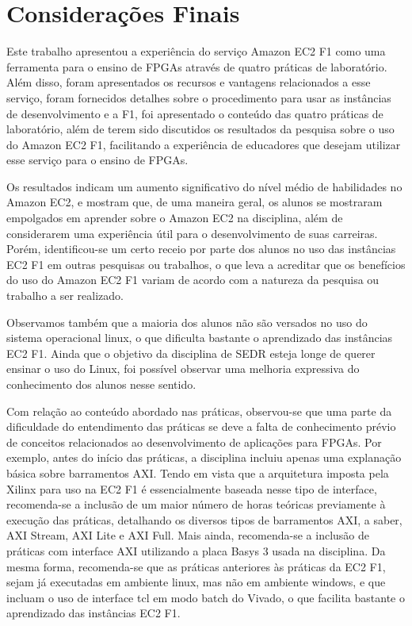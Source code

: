 \chapter{Considerações Finais}
\label{chap:conclusoes-e-trabalhos-futuros}
Este trabalho apresentou a experiência do serviço Amazon EC2 F1 como uma ferramenta para o ensino de FPGAs através de quatro práticas de laboratório. Além disso,  foram apresentados os recursos e vantagens relacionados a esse serviço, foram fornecidos detalhes sobre o procedimento para usar as instâncias de desenvolvimento e a F1, foi apresentado o conteúdo das quatro práticas de laboratório, além de terem sido discutidos os resultados da pesquisa sobre o uso do Amazon EC2 F1, facilitando a experiência de educadores que desejam utilizar esse serviço para o ensino de FPGAs.

Os resultados indicam um aumento significativo do nível médio de habilidades no Amazon EC2, e mostram que, de uma maneira geral, os alunos se mostraram empolgados em aprender sobre o Amazon EC2 na disciplina, além de considerarem uma experiência útil para o desenvolvimento de suas carreiras. Porém, identificou-se um certo receio por parte dos alunos no uso das instâncias EC2 F1 em outras pesquisas ou trabalhos, o que leva a acreditar que os benefícios do uso do Amazon EC2 F1 variam de acordo com a natureza da pesquisa ou trabalho a ser realizado.

Observamos também que a maioria dos alunos não são versados no uso do sistema operacional linux, o que dificulta bastante o aprendizado das instâncias EC2 F1. Ainda que o objetivo da disciplina de SEDR esteja longe de querer ensinar o uso do Linux, foi possível observar uma melhoria expressiva do conhecimento dos alunos nesse sentido.

Com relação ao conteúdo abordado nas práticas, observou-se que uma parte da dificuldade do entendimento das práticas se deve a falta de conhecimento prévio de conceitos relacionados ao desenvolvimento de aplicações para FPGAs. Por exemplo, antes do início das práticas, a disciplina incluiu apenas uma explanação básica sobre barramentos AXI. Tendo em vista que a arquitetura imposta pela Xilinx para uso na EC2 F1 é essencialmente baseada nesse tipo de interface, recomenda-se a inclusão de um maior número de horas teóricas previamente à execução das práticas, detalhando os diversos tipos de barramentos AXI, a saber, AXI Stream, AXI Lite e AXI Full. Mais ainda, recomenda-se a inclusão de práticas com interface AXI utilizando a placa Basys 3 usada na disciplina. Da mesma forma, recomenda-se que as práticas anteriores às práticas da EC2 F1, sejam já executadas em ambiente linux, mas não em ambiente windows, e que incluam o uso de interface tcl em modo batch do Vivado, o que facilita bastante o aprendizado das instâncias EC2 F1.



